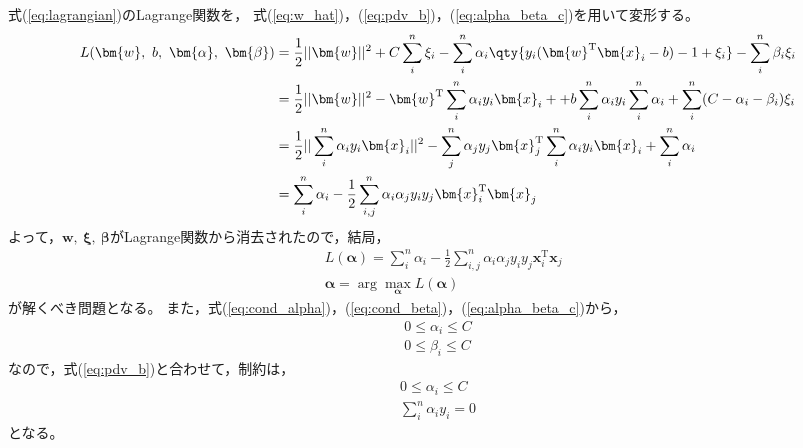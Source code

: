 \documentclass[class=jsarticle, crop=false, dvipdfmx, fleqn]{standalone}
\begin{document}
式(\ref{eq:lagrangian})のLagrange関数を，
式(\ref{eq:w_hat})，(\ref{eq:pdv_b})，(\ref{eq:alpha_beta_c})を用いて変形する。
\begin{align}
	L(\bm{w},\ b,\ \bm{\alpha},\ \bm{\beta})
		& = \frac{1}{2} ||\bm{w}||^2 + C \sum_{i}^{n} \xi_i
			- \sum_{i}^{n} \alpha_i \qty{y_i (\bm{w}^\mathrm{T} \bm{x}_i - b) - 1 + \xi_i}
			- \sum_{i}^{n} \beta_i \xi_i\\
		& = \frac{1}{2} ||\bm{w}||^2 - \bm{w}^\mathrm{T} \sum_{i}^{n} \alpha_i y_i \bm{x}_i + + b \sum_{i}^{n} \alpha_i y_i \sum_{i}^{n} \alpha_i + \sum_{i}^{n} (C - \alpha_i - \beta_i) \xi_i \\
		& = \frac{1}{2} ||\sum_{i}^{n} \alpha_i y_i \bm{x}_i||^2 - \sum_{j}^{n} \alpha_j y_j \bm{x}_j^\mathrm{T} \sum_{i}^{n} \alpha_i y_i \bm{x}_i + \sum_{i}^{n} \alpha_i \\
		& = \sum_{i}^{n} \alpha_i - \frac{1}{2} \sum_{i, j}^{n} \alpha_i \alpha_j y_i y_j \bm{x}_i^\mathrm{T} \bm{x}_j
\end{align}
よって，\(\bm{w},\ \bm{\xi},\ \bm{\beta}\)がLagrange関数から消去されたので，結局，
\begin{align}
	& L(\bm{\alpha}) = \sum_{i}^{n} \alpha_i - \frac{1}{2} \sum_{i, j}^{n} \alpha_i \alpha_j y_i y_j \bm{x}_i^\mathrm{T} \bm{x}_j \\
	& \bm{\alpha} = \arg\max_{\bm{\alpha}} L(\bm{\alpha})
\end{align}
が解くべき問題となる。
また，式(\ref{eq:cond_alpha})，(\ref{eq:cond_beta})，(\ref{eq:alpha_beta_c})から，
\begin{align}
	0 \le \alpha_i \le C \\
	0 \le \beta_i \le C
\end{align}
なので，式(\ref{eq:pdv_b})と合わせて，制約は，
\begin{align}
	0 \le \alpha_i \le C \\
	\sum_{i}^{n} \alpha_i y_i = 0
\end{align}
となる。
\end{document}
